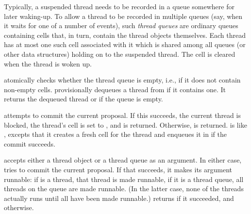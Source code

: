 Typically, a suspended thread needs to be recorded in a queue
somewhere for later waking-up.  To allow a thread to be recorded in
multiple queues (say, when it waits for one of a number of events),
such \textit{thread queues} are ordinary queues containing cells that,
in turn, contain the thread objects themselves.  Each thread has at
most one such cell associated with it which is shared among all queues
(or other data structures) holding on to the suspended thread.  The
cell is cleared when the thread is woken up.
%
\begin{protos}
\end{protos}
%
 atomically checks whether the
 thread queue is empty, i.e., if it does not
contain non-empty cells.   provisionally
dequeues a thread from  if it contains one.  It
returns the dequeued thread or  if the queue is empty.
%
\begin{protos}
\end{protos}
%
 attempts to commit the current proposal.
If this succeeds, the current thread is blocked, the thread's cell is
set to , and  is returned.  Otherwise, 
is returned.   is like
, excepts that it creates a fresh cell
for the thread and enqueues it in  if the commit
succeeds.

 accepts either a thread object or a
thread queue as an argument.  In either case,
 tries to commit the current
proposal.  If that succeeds, it 
makes its argument runnable: if  is a thread,
that thread is made runnable, if it is a thread queue, all threads on
the queue are made runnable.  (In the latter case, none of the threads
actually runs until all have been made runnable.)
 returns  if it succeeded,
and  otherwise.



